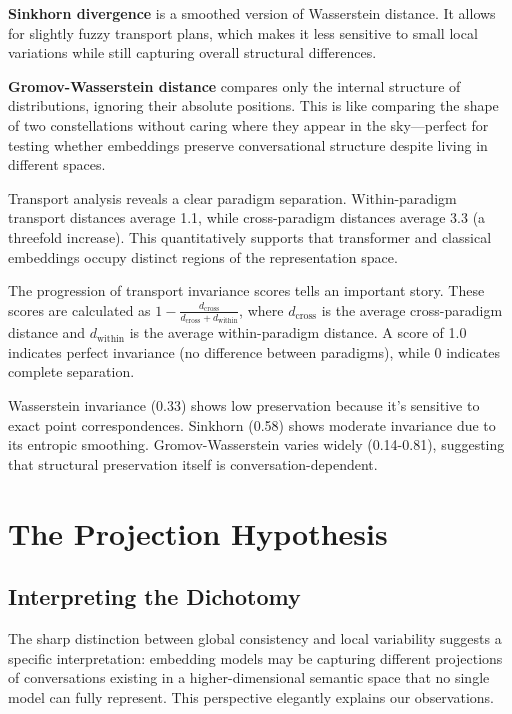 \documentclass[11pt,letterpaper]{article}
\begin{document}
\textbf{Sinkhorn divergence} is a smoothed version of Wasserstein distance. It allows for slightly fuzzy transport plans, which makes it less sensitive to small local variations while still capturing overall structural differences.

\textbf{Gromov-Wasserstein distance} compares only the internal structure of distributions, ignoring their absolute positions. This is like comparing the shape of two constellations without caring where they appear in the sky—perfect for testing whether embeddings preserve conversational structure despite living in different spaces.

Transport analysis reveals a clear paradigm separation. Within-paradigm transport distances average 1.1, while cross-paradigm distances average 3.3 (a threefold increase). This quantitatively supports that transformer and classical embeddings occupy distinct regions of the representation space.

The progression of transport invariance scores tells an important story. These scores are calculated as $1 - \frac{d_{\text{cross}}}{d_{\text{cross}} + d_{\text{within}}}$, where $d_{\text{cross}}$ is the average cross-paradigm distance and $d_{\text{within}}$ is the average within-paradigm distance. A score of 1.0 indicates perfect invariance (no difference between paradigms), while 0 indicates complete separation.

Wasserstein invariance (0.33) shows low preservation because it's sensitive to exact point correspondences. Sinkhorn (0.58) shows moderate invariance due to its entropic smoothing. Gromov-Wasserstein varies widely (0.14-0.81), suggesting that structural preservation itself is conversation-dependent.

\section{The Projection Hypothesis}

\subsection{Interpreting the Dichotomy}

The sharp distinction between global consistency and local variability suggests a specific interpretation: embedding models may be capturing different projections of conversations existing in a higher-dimensional semantic space that no single model can fully represent. This perspective elegantly explains our observations.
\end{document}
